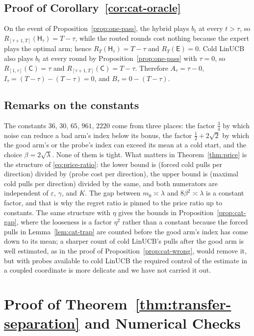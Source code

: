 \documentclass[anon]{alt2027} %
\providecommand{\qed}{\hfill\jmlrBlackBox}
\newcommand{\eps}{\varepsilon}
\newcommand{\Cold}{\mathsf{C}}
\newcommand{\Exp}{\mathsf{E}}
\newcommand{\Hyb}{\mathsf{H}}
\begin{document}
\subsection{Proof of Corollary~\ref{cor:cat-oracle}}

On the event of Proposition~\ref{prop:one-pass}, the hybrid plays $b_t$ at
every $t>\tau$, so $R_{[\tau+1,T]}(\Hyb_\tau)=T-\tau$, while the routed rounds
cost nothing because the expert plays the optimal arm; hence
$R_T(\Hyb_\tau)=T-\tau$ and $R_T(\Exp)=0$. Cold LinUCB also plays $b_t$ at
every round by Proposition~\ref{prop:one-pass} with $\tau=0$, so
$R_{[1,\tau]}(\Cold)=\tau$ and $R_{[\tau+1,T]}(\Cold)=T-\tau$. Therefore
$A_\tau=\tau-0$, $I_\tau=(T-\tau)-(T-\tau)=0$, and $B_\tau=0-(T-\tau)$. \qed

\subsection{Remarks on the constants}

The constants $36$, $30$, $65$, $961$, $2220$ come from three places: the
factor $\tfrac34$ by which noise can reduce a bad arm's index below its bonus,
the factor $\tfrac12+2\sqrt2$ by which the good arm's or the probe's index can
exceed its mean at a cold start, and the choice $\beta=2\sqrt\lambda$. None of
them is tight. What matters in Theorem~\ref{thm:price} is the structure of
\eqref{eq:price-ratio}: the lower bound is (forced cold pulls per direction)
divided by (probe cost per direction), the upper bound is (maximal cold pulls
per direction) divided by the same, and both numerators are independent of
$\eps$, $\gamma$, and $K$. The gap between $m_0\asymp\lambda$ and $8\beta^2\asymp\lambda$
is a constant factor, and that is why the regret ratio is pinned to the price
ratio up to constants. The same structure with $\eta$ gives the bounds in
Proposition~\ref{prop:cat-gap}, where the looseness is a factor $\eta^2$ rather
than a constant because the forced pulls in Lemma~\ref{lem:cat-trap} are
counted before the good arm's index has come down to its mean; a sharper
count of cold LinUCB's pulls after the good arm is well estimated, as in the
proof of Proposition~\ref{prop:cat-wrong}, would remove it, but with probes
available to cold LinUCB the required control of the estimate in a coupled
coordinate is more delicate and we have not carried it out.


\section{Proof of Theorem~\ref{thm:transfer-separation} and Numerical Checks}
\label{app:proof-transfer-sep}
\end{document}
